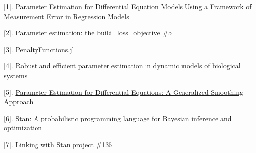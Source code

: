 \documentclass[11pt]{article}
\begin{document}
{[}1{]}.
\href{https://www.ncbi.nlm.nih.gov/pmc/articles/PMC2631937/}{Parameter
Estimation for Differential Equation Models Using a Framework of
Measurement Error in Regression Models}

{[}2{]}. Parameter estimation: the build\_loss\_objective
\href{https://github.com/JuliaDiffEq/DiffEqParamEstim.jl/issues/5}{\#5}

{[}3{]}.
\href{https://github.com/JuliaML/PenaltyFunctions.jl}{PenaltyFunctions.jl}

{[}4{]}.
\href{http://bmcsystbiol.biomedcentral.com/articles/10.1186/s12918-015-0219-2}{Robust
and efficient parameter estimation in dynamic models of biological
systems}

{[}5{]}.
\href{http://faculty.bscb.cornell.edu/~hooker/ODE_Estimation.pdf}{Parameter
Estimation for Differential Equations: A Generalized Smoothing Approach}

{[}6{]}.
\href{http://www.stat.columbia.edu/~gelman/research/published/stan_jebs_2.pdf}{Stan:
A probabilistic programming language for Bayesian inference and
optimization}

{[}7{]}. Linking with Stan project
\href{https://github.com/JuliaDiffEq/DifferentialEquations.jl/issues/135}{\#135}


    
    
    
    
\end{document}

